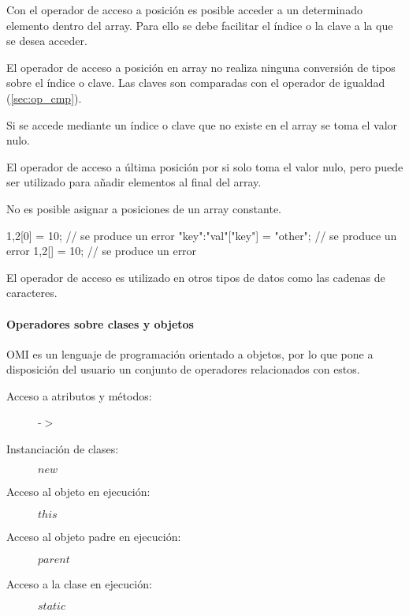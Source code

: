 Con el operador de acceso a posición es posible acceder a un determinado elemento
dentro del array. Para ello se debe facilitar el índice o la clave a la que 
se desea acceder. 

El operador de acceso a posición en array no realiza ninguna conversión de tipos sobre 
el índice o clave. Las claves son comparadas con el operador de igualdad (\autoref{sec:op_cmp}).

Si se accede mediante un índice o clave que no existe en el array se toma el valor nulo.

El operador de acceso a última posición por si solo toma el valor nulo, pero puede ser utilizado 
para añadir elementos al final del array. 

No es posible asignar a posiciones de un array constante. \\

\begin{myverbatim}
   {1,2}[0] = 10; // se produce un error
   {"key":"val"}["key"] = "other"; // se produce un error
   {1,2}[] = 10; // se produce un error
\end{myverbatim} 

El operador de acceso es utilizado en otros tipos de datos como las cadenas
de caracteres.


\paragraph{Operadores sobre clases y objetos} \label{sec:op_object}

OMI es un lenguaje de programación orientado a objetos, por lo que pone a 
disposición del usuario un conjunto de operadores relacionados con estos. \\

\begin{description}
\item [Acceso a atributos y métodos:] -$>$
\item [Instanciación de clases:] $new$
\item [Acceso al objeto en ejecución:] $this$ 
\item [Acceso al objeto padre en ejecución:] $parent$ 
\item [Acceso a la clase en ejecución:] $static$ 
\end{description} 

